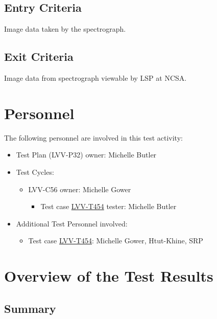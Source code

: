 \documentclass[DM,lsstdraft,STR,toc]{lsstdoc}
\begin{document}
  \subsection{Entry Criteria}
  Image data taken by the spectrograph. ~


  \subsection{Exit Criteria}
  Image data from spectrograph viewable by LSP at NCSA.~



\newpage
\section{Personnel}
\label{sect:personnel}

The following personnel are involved in this test activity:

\begin{itemize}
\item Test Plan (LVV-P32) owner: Michelle Butler
\item Test Cycles:
\begin{itemize}
  \item LVV-C56 owner: 
    Michelle Gower
  \begin{itemize}
    \item Test case \href{https://jira.lsstcorp.org/secure/Tests.jspa#/testCase/LVV-T454}{LVV-T454} tester: Michelle Butler
  \end{itemize}
\end{itemize}
\item Additional Test Personnel involved:
  \begin{itemize}
    \item Test case \href{https://jira.lsstcorp.org/secure/Tests.jspa#/testCase/LVV-T454}{LVV-T454}: Michelle Gower, Htut-Khine, SRP

  \end{itemize}
\end{itemize}

\newpage

\section{Overview of the Test Results}
\label{sect:overview}

\subsection{Summary}
\label{sect:summarytable}
\end{document}
